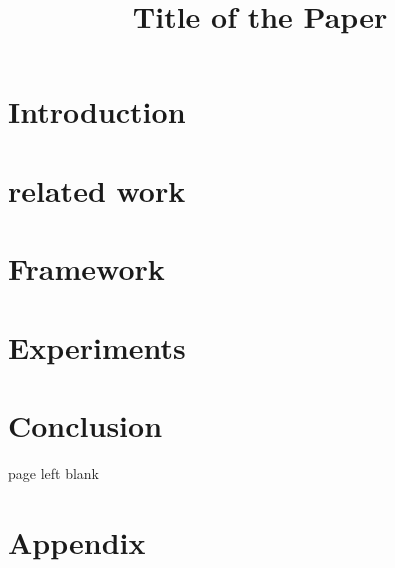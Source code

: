 \documentclass[conference]{IEEEtran}
\title{Title of the Paper}
\author{}
\date{}
\begin{document}
\maketitle

\begin{abstract}
    
\end{abstract}

\section{Introduction}
\label{sec:introduction}


\section{related work}
\label{sec:related-work}


\section{Framework}
\label{sec:framework}


\section{Experiments}
\label{sec:experiments}


\section{Conclusion}
\label{sec:conclusion}


\clearpage
page left blank
\clearpage




\appendix
\section{Appendix}
\label{sec:appendix}

\end{document}
